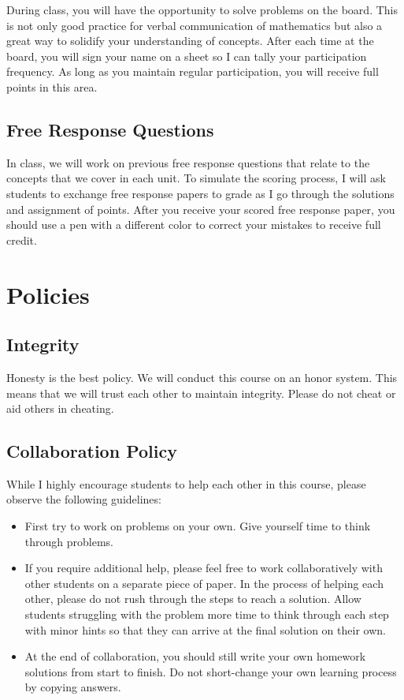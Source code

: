 \documentclass[12pt,fleqn]{article}
\providecommand{\tightlist}{%
  \setlength{\itemsep}{0pt}\setlength{\parskip}{0pt}}
\begin{document}
During class, you will have the opportunity to solve problems on the board. This is not only good practice for verbal communication of mathematics but also a great way to solidify your understanding of concepts. After each time at the board, you will sign your name on a sheet so I can tally your participation frequency. As long as you maintain regular participation, you will receive full points in this area.

\hypertarget{free-response-questions}{%
\subsection{Free Response Questions}\label{free-response-questions}}

In class, we will work on previous free response questions that relate to the concepts that we cover in each unit. To simulate the scoring process, I will ask students to exchange free response papers to grade as I go through the solutions and assignment of points. After you receive your scored free response paper, you should use a pen with a different color to correct your mistakes to receive full credit.

\hypertarget{policies}{%
\section{Policies}\label{policies}}

\hypertarget{integrity}{%
\subsection{Integrity}\label{integrity}}

Honesty is the best policy. We will conduct this course on an honor system. This means that we will trust each other to maintain integrity. Please do not cheat or aid others in cheating.

\hypertarget{collaboration-policy}{%
\subsection{Collaboration Policy}\label{collaboration-policy}}

While I highly encourage students to help each other in this course, please observe the following guidelines:

\begin{itemize}
\tightlist
\item
  First try to work on problems on your own. Give yourself time to think through problems.
\item
  If you require additional help, please feel free to work collaboratively with other students on a separate piece of paper. In the process of helping each other, please do not rush through the steps to reach a solution. Allow students struggling with the problem more time to think through each step with minor hints so that they can arrive at the final solution on their own.
\item
  At the end of collaboration, you should still write your own homework solutions from start to finish. Do not short-change your own learning process by copying answers.
\end{itemize}
\end{document}
